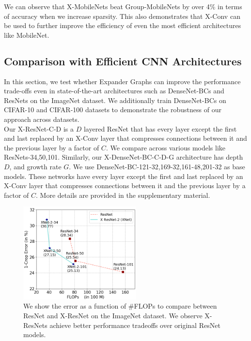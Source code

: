 \noindent We can observe that X-MobileNets beat Group-MobileNets by over 4\% in terms of accuracy when we increase sparsity. This also demonstrates that X-Conv can be used to further improve the efficiency of even the most efficient architectures like MobileNet.

\subsection{Comparison with Efficient CNN Architectures}
\label{sec:denres}

\noindent In this section, we test whether Expander Graphs can improve the performance trade-offs even in state-of-the-art architectures such as DenseNet-BCs \cite{huang2017densely} and ResNets\cite{he2016deep} on the ImageNet \cite{deng2009imagenet} dataset. We additionally train DenseNet-BCs on CIFAR-10 and CIFAR-100 \cite{krizhevsky2009learning} datasets to demonstrate the robustness of our approach across datasets.\\ 

\noindent Our X-ResNet-C-D is a $D$ layered ResNet that has every layer except the first and last replaced by an X-Conv layer that compresses connections between it and the previous layer by a factor of $C$. We compare across various models like ResNets-34,50,101. Similarly, our X-DenseNet-BC-C-D-G architecture has depth $D$, and growth rate $G$. We use DenseNet-BC-121-32,169-32,161-48,201-32 as base models. These networks have every layer except the first and last replaced by an X-Conv layer that compresses connections between it and the previous layer by a factor of $C$. More details are provided in the supplementary material.\\

\begin{figure}
\centering
\includegraphics[width=0.55\textwidth]{figures/resnet.png}
\caption{We show the error as a function of \#FLOPs to compare between ResNet and X-ResNet on the ImageNet dataset. We observe X-ResNets achieve better performance tradeoffs over original ResNet models.}
\label{fig:resnet}
\end{figure}
   
